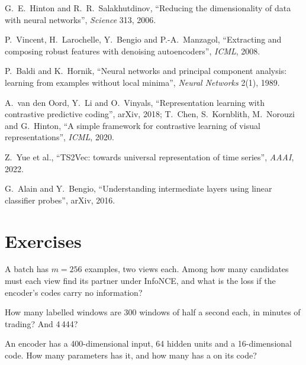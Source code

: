 \begin{omsources}
\item G.~E.~Hinton and R.~R.~Salakhutdinov, ``Reducing the dimensionality of data with neural networks'', \emph{Science}
313, 2006.
\item P.~Vincent, H.~Larochelle, Y.~Bengio and P.-A.~Manzagol, ``Extracting and composing robust features with denoising
autoencoders'', \emph{ICML}, 2008.
\item P.~Baldi and K.~Hornik, ``Neural networks and principal component analysis: learning from examples without local
minima'', \emph{Neural Networks} 2(1), 1989.
\item A.~van den Oord, Y.~Li and O.~Vinyals, ``Representation learning with contrastive predictive coding'', arXiv, 2018;
T.~Chen, S.~Kornblith, M.~Norouzi and G.~Hinton, ``A simple framework for contrastive learning of visual representations'',
\emph{ICML}, 2020.
\item Z.~Yue et al., ``TS2Vec: towards universal representation of time series'', \emph{AAAI}, 2022.
\item G.~Alain and Y.~Bengio, ``Understanding intermediate layers using linear classifier probes'', arXiv, 2016.
\end{omsources}

\section{Exercises}

\begin{exercise}[$\star$]\label{exo:ml:representation-learning:1}
A batch has $m = 256$ examples, two views each. Among how many candidates must each view find its partner under InfoNCE,
and what is the loss if the encoder's codes carry no information?
\end{exercise}

\begin{exercise}[$\star$]\label{exo:ml:representation-learning:2}
How many labelled windows are 300 windows of half a second each, in minutes of trading? And 4\,444?
\end{exercise}

\begin{exercise}[$\star$]\label{exo:ml:representation-learning:3}
An encoder has a 400-dimensional input, 64 hidden units and a 16-dimensional code. How many parameters has it, and how
many has a  on its code?
\end{exercise}

